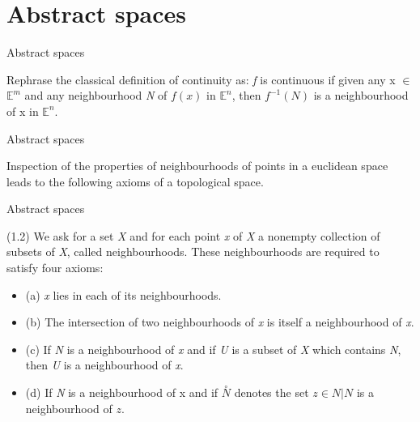\documentclass{beamer}
\begin{document}
\section{Abstract spaces}

\begin{frame}{Abstract spaces}
  \begin{block}{}
    Rephrase the classical definition of continuity as: \textsl{f} is continuous if given any x $\in$ $\mathbb{E}^m$ and any neighbourhood \textsl{N} of $f(x)$ in $\mathbb{E}^n$, then $f^{-1}(N)$ is a neighbourhood of x in $\mathbb{E}^n$.
  \end{block}
\end{frame}

\begin{frame}{Abstract spaces}
  \begin{block}{}
    Inspection of the properties of neighbourhoods of points in a euclidean space leads to the following axioms of a topological space.
  \end{block}
\end{frame}

\begin{frame}{Abstract spaces}
  \begin{block}{}
    (1.2) We ask for a set \textsl{X} and for each point \textsl{x} of \textsl{X} a nonempty collection of subsets of \textsl{X}, called neighbourhoods. These neighbourhoods are required to satisfy four axioms:
    \begin{itemize}
    \item (a) \textsl{x} lies in each of its neighbourhoods.
    \item (b) The intersection of two neighbourhoods of \textsl{x} is itself a neighbourhood of \textsl{x}.
    \item (c) If \textsl{N} is a neighbourhood of \textsl{x} and if \textsl{U} is a subset of \textsl{X} which contains \textsl{N}, then \textsl{U} is a neighbourhood of \textsl{x}.
    \item (d) If \textsl{N} is a neighbourhood of x and if $\overset{\circ}{N}$ denotes the set {{$z \in N|N$ is a neighbourhood of $z$}}.
    \end{itemize}
  \end{block}
\end{frame}
\end{document}
